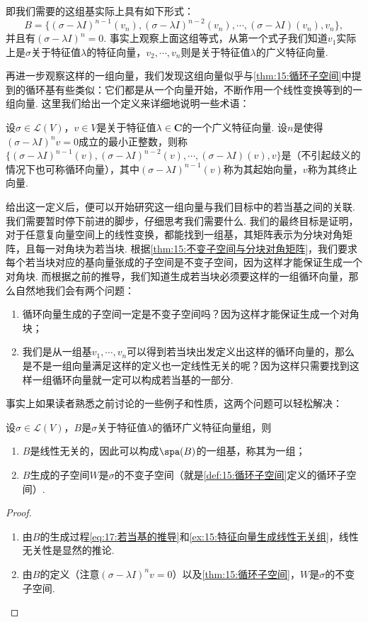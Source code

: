 即我们需要的这组基实际上具有如下形式：
\[B=\{(\sigma-\lambda I)^{n-1}(v_n),(\sigma-\lambda I)^{n-2}(v_n),\cdots,(\sigma-\lambda I)(v_n),v_n\},\]
并且有$(\sigma-\lambda I)^n=0$. 事实上观察上面这组等式，从第一个式子我们知道$v_1$实际上是$\sigma$关于特征值$\lambda$的特征向量，$v_2,\cdots,v_n$则是关于特征值$\lambda$的广义特征向量.

再进一步观察这样的一组向量，我们发现这组向量似乎与\autoref{thm:15:循环子空间}中提到的循环基有些类似：它们都是从一个向量开始，不断作用一个线性变换等到的一组向量. 这里我们给出一个定义来详细地说明一些术语：
\begin{definition} \label{def:17:若当循环基}
    设$\sigma\in\mathcal{L}(V)$，$v\in V$是关于特征值$\lambda\in\mathbf{C}$的一个广义特征向量. 设$n$是使得$(\sigma-\lambda I)^n v=0$成立的最小正整数，则称$\{(\sigma-\lambda I)^{n-1}(v),(\sigma-\lambda I)^{n-2}(v),\cdots,(\sigma-\lambda I)(v),v\}$是（不引起歧义的情况下也可称循环向量），其中$(\sigma-\lambda I)^{n-1}(v)$称为其起始向量，$v$称为其终止向量.
\end{definition}

给出这一定义后，便可以开始研究这一组向量与我们目标中的若当基之间的关联. 我们需要暂时停下前进的脚步，仔细思考我们需要什么. 我们的最终目标是证明，对于任意复向量空间上的线性变换，都能找到一组基，其矩阵表示为分块对角矩阵，且每一对角块为若当块. 根据\autoref{thm:15:不变子空间与分块对角矩阵}，我们要求每个若当块对应的基向量张成的子空间是不变子空间，因为这样才能保证生成一个对角块. 而根据之前的推导，我们知道生成若当块必须要这样的一组循环向量，那么自然地我们会有两个问题：
\begin{enumerate}
    \item 循环向量生成的子空间一定是不变子空间吗？因为这样才能保证生成一个对角块；
    \item 我们是从一组基$v_1,\cdots,v_n$可以得到若当块出发定义出这样的循环向量的，那么是不是一组向量满足这样的定义也一定线性无关的呢？因为这样只需要找到这样一组循环向量就一定可以构成若当基的一部分.
\end{enumerate}
事实上如果读者熟悉之前讨论的一些例子和性质，这两个问题可以轻松解决：
\begin{theorem} \label{thm:17:若当循环基的性质}
    设$\sigma\in\mathcal{L}(V)$，$B$是$\sigma$关于特征值$\lambda$的循环广义特征向量组，则
    \begin{enumerate}
        \item $B$是线性无关的，因此可以构成$\spa(B)$的一组基，称其为一组；
        \item $B$生成的子空间$W$是$\sigma$的不变子空间（就是\autoref{def:15:循环子空间}定义的循环子空间）.
    \end{enumerate}
\end{theorem}
\begin{proof}
    \begin{enumerate}
        \item 由$B$的生成过程\autoref{eq:17:若当基的推导}和\autoref{ex:15:特征向量生成线性无关组}，线性无关性是显然的推论.
        \item 由$B$的定义（注意$(\sigma-\lambda I)^n v=0$）以及\autoref{thm:15:循环子空间}，$W$是$\sigma$的不变子空间.
    \end{enumerate}
\end{proof}

